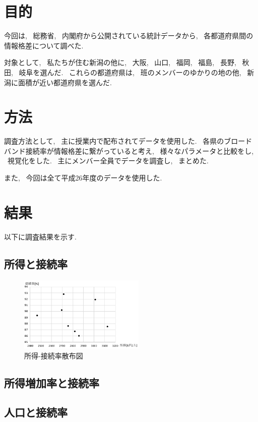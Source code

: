 \documentclass{jsarticle}
\begin{document}
\section{目的}
    今回は, ~総務省, ~内閣府から公開されている統計データから,
    ~各都道府県間の情報格差について調べた.

    対象として, ~私たちが住む新潟の他に, ~大阪, ~山口, ~福岡,
    ~福島, ~長野, ~秋田, ~岐阜を選んだ.
    ~これらの都道府県は, ~班のメンバーのゆかりの地の他,
    ~新潟に面積が近い都道府県を選んだ.

\section{方法}
    調査方法として, ~主に授業内で配布されてデータを使用した.
    ~各県のブロードバンド接続率が情報格差に繋がっていると考え,
    ~様々なパラメータと比較をし, ~視覚化をした.
    ~主にメンバー全員でデータを調査し, ~まとめた.

    また, ~今回は全て平成26年度のデータを使用した.

\section{結果}
    以下に調査結果を示す.

    \subsection{所得と接続率}
        \begin{center}
            \begin{figure}
                \includegraphics[width=6cm]{所得.pdf}
                \caption{所得-接続率散布図}
                \label{fig:所得}
            \end{figure}
        \end{center}
        

    \subsection{所得増加率と接続率}

    \subsection{人口と接続率}
\end{document}
